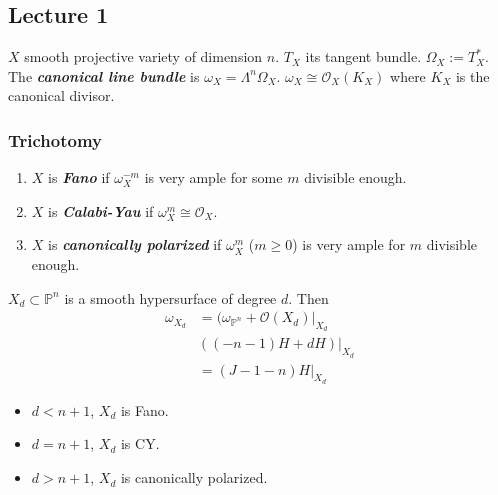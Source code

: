 \subsection{Lecture 1}

$X$ smooth projective variety of dimension $n$. $T_{X}$ its tangent bundle. $\Omega_{X}:=T^{*}_{X}$. The \textit{\textbf{canonical line bundle}} is  $\omega_{X}=\Lambda^{n} \Omega_{X}$. $\omega_{X}\cong \mathcal{O}_{X}(K_{X})$ where $K_{X}$ is the canonical divisor.

\subsubsection{Trichotomy}
\begin{enumerate}
	\item $X$ is \textit{\textbf{Fano}} if $\omega_{X}^{-m}$ is very ample for some $m$ divisible enough.
	\item $X$ is \textit{\textbf{Calabi-Yau}} if $\omega_{X}^{m} \cong  \mathcal{O}_{X}$.
	\item $X$ is \textit{\textbf{canonically polarized}} if $\omega_{X}^{m}$ ($m\geq 0$) is very ample for $m$ divisible enough.
\end{enumerate}

\begin{example}
	$X_{d}\subset \mathbb{P}^{n}$ is a smooth hypersurface of degree $d$. Then 
	\begin{align*}
		\omega_{X_{d}}&=(\omega_{\mathbb{P}^{n}}+\mathcal{O}(X_{d})|_{X_{d}}\\
			      &((-n-1)H+dH)|_{X_{d}}\\
			      &=(J-1-n)H|_{X_{d}}
	\end{align*}
	\begin{itemize}
		\item $d<n+1$,  $X_{d}$ is Fano.
		\item $d=n+1$, $X_{d}$ is CY.
		\item $d>n+1$,  $X_{d}$ is canonically polarized.
	\end{itemize}
\end{example}

